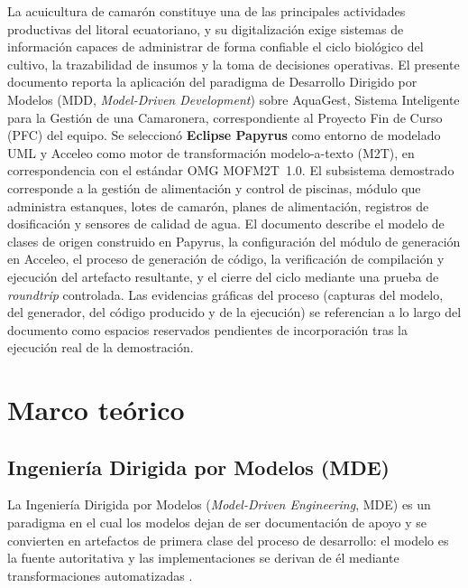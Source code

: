 \documentclass[11pt,a4paper]{article}
\begin{document}
La acuicultura de camarón constituye una de las principales actividades productivas del litoral
ecuatoriano, y su digitalización exige sistemas de información capaces de administrar de forma
confiable el ciclo biológico del cultivo, la trazabilidad de insumos y la toma de decisiones operativas.
El presente documento reporta la aplicación del paradigma de Desarrollo Dirigido por Modelos (MDD,
\textit{Model-Driven Development}) sobre AquaGest, Sistema Inteligente para la Gestión de una
Camaronera, correspondiente al Proyecto Fin de Curso (PFC) del equipo. Se seleccionó
\textbf{Eclipse Papyrus} como entorno de modelado UML y Acceleo como motor de
transformación modelo-a-texto (M2T), en correspondencia con el estándar OMG MOFM2T~1.0. El
subsistema demostrado corresponde a la gestión de alimentación y control de piscinas,
módulo que administra estanques, lotes de camarón, planes de alimentación, registros de dosificación
y sensores de calidad de agua. El documento describe el modelo de clases de origen construido en
Papyrus, la configuración del módulo de generación en Acceleo, el proceso de generación de código,
la verificación de compilación y ejecución del artefacto resultante, y el cierre del ciclo mediante una
prueba de \textit{roundtrip} controlada. Las evidencias gráficas del proceso (capturas del modelo, del
generador, del código producido y de la ejecución) se referencian a lo largo del documento como
espacios reservados pendientes de incorporación tras la ejecución real de la demostración.

\section{Marco teórico}

\subsection{Ingeniería Dirigida por Modelos (MDE)}
La Ingeniería Dirigida por Modelos (\textit{Model-Driven Engineering}, MDE) es un paradigma en el
cual los modelos dejan de ser documentación de apoyo y se convierten en artefactos de primera clase
del proceso de desarrollo: el modelo es la fuente autoritativa y las implementaciones se derivan de él
mediante transformaciones automatizadas \cite{schmidt2006,bucchiarone2020}.
\end{document}
